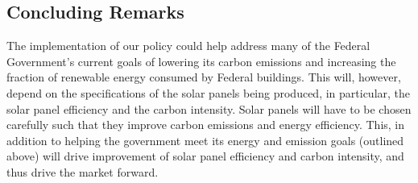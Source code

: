 \subsection{Concluding Remarks}
The implementation of our policy could help address many of the Federal Government’s current goals of lowering its carbon emissions and increasing the fraction of renewable energy consumed by Federal buildings. This will, however, depend on the specifications of the solar panels being produced, in particular, the solar panel efficiency and the carbon intensity. Solar panels will have to be chosen carefully such that they improve carbon emissions and energy efficiency. This, in addition to helping the government meet its energy and emission goals (outlined above) will drive improvement of solar panel efficiency and carbon intensity, and thus drive the market forward.

